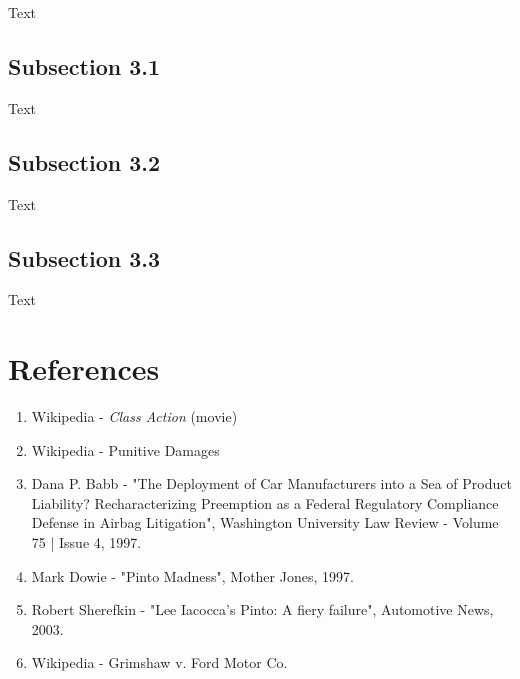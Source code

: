Text


\subsection{Subsection 3.1}

Text


\subsection{Subsection 3.2}

Text


\subsection{Subsection 3.3}

Text

\pagebreak



\section*{\textbf{References}}

\begin{enumerate}
	\item Wikipedia - \textit{Class Action} (movie)
	\item Wikipedia - Punitive Damages
	\item Dana P. Babb - "The Deployment of Car Manufacturers into a Sea of Product Liability? Recharacterizing Preemption as a Federal Regulatory Compliance Defense in Airbag Litigation", Washington University Law Review - Volume 75 | Issue 4, 1997.
	\item Mark Dowie - "Pinto Madness", Mother Jones, 1997.
	\item Robert Sherefkin - "Lee Iacocca's Pinto: A fiery failure", Automotive News, 2003.
	\item Wikipedia - Grimshaw v. Ford Motor Co.
\end{enumerate}

